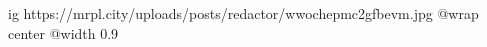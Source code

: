  
 
 
 
 

\ifcmt
  ig https://mrpl.city/uploads/posts/redactor/wwochepmc2gfbevm.jpg
  @wrap center
  @width 0.9
\fi
